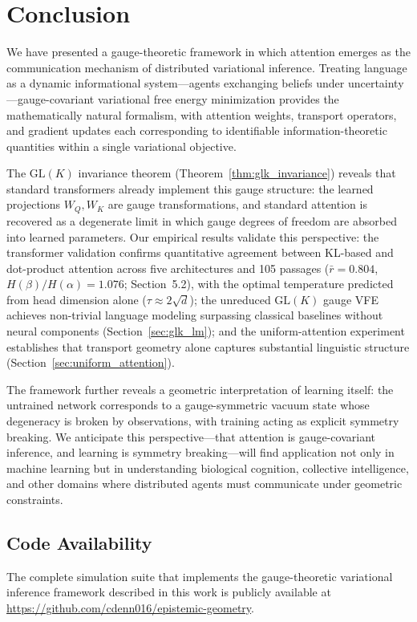 \documentclass[twoside,11pt]{article}
\begin{document}
\section{Conclusion}

We have presented a gauge-theoretic framework in which attention emerges as the communication mechanism of distributed variational inference. Treating language as a dynamic informational system---agents exchanging beliefs under uncertainty---gauge-covariant variational free energy minimization provides the mathematically natural formalism, with attention weights, transport operators, and gradient updates each corresponding to identifiable information-theoretic quantities within a single variational objective.

The $\mathrm{GL}(K)$ invariance theorem (Theorem~\ref{thm:glk_invariance}) reveals that standard transformers already implement this gauge structure: the learned projections $W_Q, W_K$ are gauge transformations, and standard attention is recovered as a degenerate limit in which gauge degrees of freedom are absorbed into learned parameters. Our empirical results validate this perspective: the transformer validation confirms quantitative agreement between KL-based and dot-product attention across five architectures and 105 passages ($\bar{r} = 0.804$, $H(\beta)/H(\alpha) = 1.076$; Section~5.2), with the optimal temperature predicted from head dimension alone ($\tau \approx 2\sqrt{d}$); the unreduced $\mathrm{GL}(K)$ gauge VFE achieves non-trivial language modeling surpassing classical baselines without neural components (Section~\ref{sec:glk_lm}); and the uniform-attention experiment establishes that transport geometry alone captures substantial linguistic structure (Section~\ref{sec:uniform_attention}).

The framework further reveals a geometric interpretation of learning itself: the untrained network corresponds to a gauge-symmetric vacuum state whose degeneracy is broken by observations, with training acting as explicit symmetry breaking. We anticipate this perspective---that attention is gauge-covariant inference, and learning is symmetry breaking---will find application not only in machine learning but in understanding biological cognition, collective intelligence, and other domains where distributed agents must communicate under geometric constraints.


\subsection{Code Availability}
The complete simulation suite that implements the gauge-theoretic variational inference framework described in this work is publicly available at \href{https://github.com/cdenn016/epistemic-geometry}{https://github.com/cdenn016/epistemic-geometry}.
\end{document}
